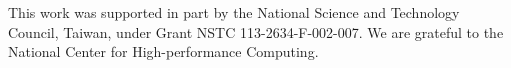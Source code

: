 This work was supported in part by the National Science and Technology Council, Taiwan, under Grant NSTC 113-2634-F-002-007. We are grateful to the National Center for High-performance Computing.